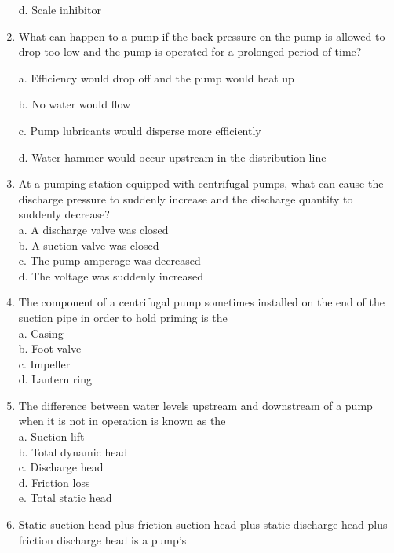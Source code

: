 \documentclass{article}
\begin{document}
\begin{enumerate}[1.]
d. Scale inhibitor\\

\item What can happen to a pump if the back pressure on the pump is allowed to drop too low and the pump is operated for a prolonged period of time?

a. Efficiency would drop off and the pump would heat up

b. No water would flow

c. Pump lubricants would disperse more efficiently

d. Water hammer would occur upstream in the distribution line

\item At a pumping station equipped with centrifugal pumps, what can cause the discharge pressure to suddenly increase and the discharge quantity to suddenly decrease?\\
a. A discharge valve was closed\\
b. A suction valve was closed\\
c. The pump amperage was decreased\\
d. The voltage was suddenly increased\\

\item The component of a centrifugal pump sometimes installed on the end of the suction pipe in order to hold priming is the\\
a. Casing\\
b. Foot valve\\
c. Impeller\\
d. Lantern ring\\

  \item The difference between water levels upstream and downstream of a pump when it is not in operation is known as the\\

a. Suction lift\\

b. Total dynamic head\\

c. Discharge head\\

d. Friction loss\\

e. Total static head\\

\item Static suction head plus friction suction head plus static discharge head plus friction discharge head is a pump's\\


\end{enumerate}
\end{document}
